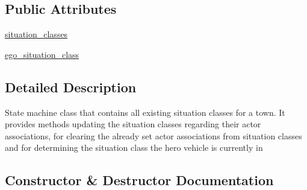 \subsection*{Public Attributes}
\begin{DoxyCompactItemize}
\item 
\hyperlink{classimplementation_1_1actor__situation__class__detection_1_1situation__class__state__machine_1_1_situation_class_state_machine_aa4eb1ddf0aa9f37f77c1bb3453b36161}{situation\+\_\+classes}
\item 
\hyperlink{classimplementation_1_1actor__situation__class__detection_1_1situation__class__state__machine_1_1_situation_class_state_machine_ab028cc98852fbcc54f37c51c1fc7128d}{ego\+\_\+situation\+\_\+class}
\end{DoxyCompactItemize}


\subsection{Detailed Description}
\begin{DoxyVerb}State machine class that contains all existing situation classes for a town. It provides methods updating the
situation classes regarding their actor associations, for clearing the already set actor associations from
situation classes and for determining the situation class the hero vehicle is currently in
\end{DoxyVerb}
 

\subsection{Constructor \& Destructor Documentation}
\mbox{\label{classimplementation_1_1actor__situation__class__detection_1_1situation__class__state__machine_1_1_situation_class_state_machine_ae25ddb59e6a7d8a1ebfdd1e1441b5755}} 
